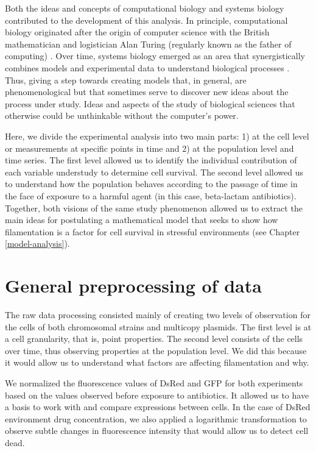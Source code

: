 \documentclass[
  12pt,
  a4paper,
  oneside]{krantz}
\begin{document}
Both the ideas and concepts of computational biology and systems biology
contributed to the development of this analysis. In principle,
computational biology originated after the origin of computer science
with the British mathematician and logistician Alan Turing (regularly
known as the father of computing) \citep{turing1950}. Over time, systems
biology emerged as an area that synergistically combines models and
experimental data to understand biological processes \citep{bruggeman}. Thus,
giving a step towards creating models that, in general, are
phenomenological but that sometimes serve to discover new ideas about
the process under study. Ideas and aspects of the study of biological
sciences that otherwise could be unthinkable without the computer's
power.

Here, we divide the experimental analysis into two main parts: 1) at the
cell level or measurements at specific points in time and 2) at the
population level and time series. The first level allowed us to identify
the individual contribution of each variable understudy to determine
cell survival. The second level allowed us to understand how the
population behaves according to the passage of time in the face of
exposure to a harmful agent (in this case, beta-lactam antibiotics).
Together, both visions of the same study phenomenon allowed us to
extract the main ideas for postulating a mathematical model that seeks
to show how filamentation is a factor for cell survival in stressful
environments (see Chapter \ref{model-analysis}).

\hypertarget{experiment-general-preprocessing}{%
\section{General preprocessing of data}\label{experiment-general-preprocessing}}

The raw data processing consisted mainly of creating two levels of
observation for the cells of both chromosomal strains and multicopy
plasmids. The first level is at a cell granularity, that is, point
properties. The second level consists of the cells over time, thus
observing properties at the population level. We did this because it
would allow us to understand what factors are affecting filamentation
and why.

We normalized the fluorescence values of DsRed and GFP for both
experiments based on the values observed before exposure to antibiotics.
It allowed us to have a basis to work with and compare expressions
between cells. In the case of DsRed environment drug concentration, we
also applied a logarithmic transformation to observe subtle changes in
fluorescence intensity that would allow us to detect cell dead.
\end{document}
